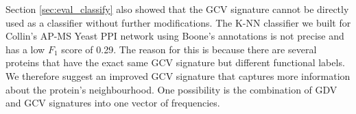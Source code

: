 Section \ref{sec:eval_classify} also showed that the GCV signature cannot be directly used as a classifier without further modifications. The K-NN classifier we built for Collin's AP-MS Yeast PPI network using Boone's annotations is not precise and has a low $F_1$ score of 0.29. The reason for this is because there are several proteins that have the exact same GCV signature but different functional labels. We therefore suggest an improved GCV signature that captures more information about the protein's neighbourhood. One possibility is the combination of GDV and GCV signatures into one vector of frequencies. 
